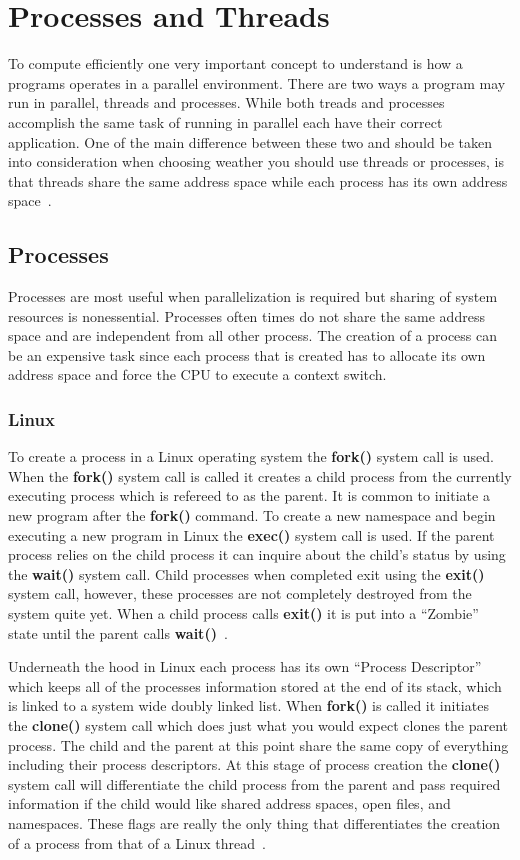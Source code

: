 \documentclass[letterpaper,10pt,notitlepage,fleqn]{article}
\begin{document}
\section{Processes and Threads}
To compute efficiently one very important concept to understand is how a programs operates in 
a parallel environment. There are two ways a program may run in parallel, 
threads and processes. While both treads and processes accomplish the same task of 
running in parallel each have their correct application. One of the main difference 
between these two and should be taken into consideration when choosing weather 
you should use threads or processes, is that threads 
share the same address space while each process has its own address space~\cite{PI}.

\subsection{Processes}
Processes are most useful when parallelization is required but sharing of system resources 
is nonessential. Processes often times do not share the same address space and are independent 
from all other process. The creation of a process can be an expensive task since 
each process that is created has to allocate its own address space and force the 
CPU to execute a context switch. 

\subsubsection*{Linux}
To create a process in a Linux operating system the \textbf{fork()} system call is 
used. When the \textbf{fork()} system call is called it creates a child process from 
the currently executing process which is refereed to as the parent. It is common to 
initiate a new program after the \textbf{fork()} command. To create a new namespace 
and begin executing a new program in Linux the \textbf{exec()} system call is used. 
If the parent process relies on the child process it can inquire about the child's 
status by using the \textbf{wait()} system call. Child processes when completed exit 
using the \textbf{exit()} system call, however, these processes are not completely 
destroyed from the system quite yet. When a child process calls \textbf{exit()} it is put 
into a ``Zombie'' state until the parent calls \textbf{wait()}~\cite{LKD3}.

Underneath the hood in Linux each process has its own ``Process Descriptor'' which 
keeps all of the processes information stored at the end of its stack, which is linked 
to a system wide doubly linked list. When \textbf{fork()} is called it initiates 
the \textbf{clone()} system call which does just what you would expect clones the 
parent process. The child and the parent at this point share the same copy of everything 
including their process descriptors. At this stage of process creation the \textbf{clone()} 
system call will differentiate the child process from the parent and pass required 
information if the child would like shared address spaces, open files, and 
namespaces. These flags are really the only thing that differentiates the creation 
of a process from that of a Linux thread~\cite{LKD3}.
\end{document}
